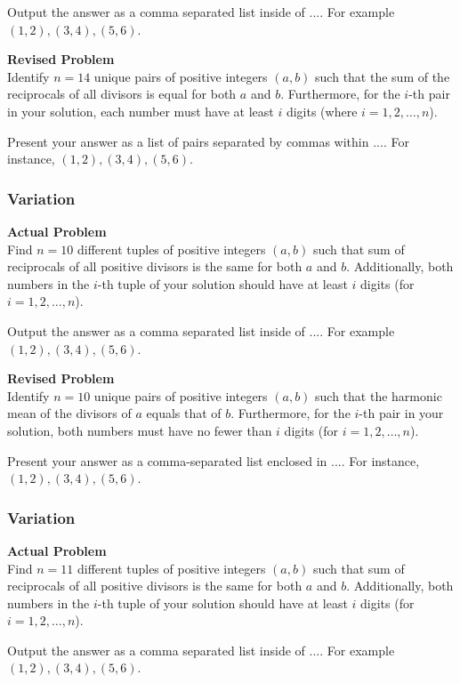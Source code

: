 Output the answer as a comma separated list inside of $\boxed{...}$. For example $\boxed{(1, 2), (3, 4), (5, 6)}$.

\textbf{Revised Problem}\\
Identify $n = 14$ unique pairs of positive integers $(a, b)$ such that the sum of the reciprocals of all divisors is equal for both $a$ and $b$. Furthermore, for the $i$-th pair in your solution, each number must have at least $i$ digits (where $i = 1, 2, \ldots, n$).

Present your answer as a list of pairs separated by commas within $\boxed{...}$. For instance, $\boxed{(1, 2), (3, 4), (5, 6)}$.

\subsubsection{Variation}
\textbf{Actual Problem}\\
Find $n = 10$ different tuples of positive integers $(a, b)$ such that sum of reciprocals of all positive divisors is the same for both $a$ and $b$.
Additionally, both numbers in the $i$-th tuple of your solution should have at least $i$ digits (for $i = 1, 2, \ldots, n$).


Output the answer as a comma separated list inside of $\boxed{...}$. For example $\boxed{(1, 2), (3, 4), (5, 6)}$.

\textbf{Revised Problem}\\
Identify $n = 10$ unique pairs of positive integers $(a, b)$ such that the harmonic mean of the divisors of $a$ equals that of $b$. Furthermore, for the $i$-th pair in your solution, both numbers must have no fewer than $i$ digits (for $i = 1, 2, \ldots, n$).

Present your answer as a comma-separated list enclosed in $\boxed{...}$. For instance, $\boxed{(1, 2), (3, 4), (5, 6)}$.

\subsubsection{Variation}
\textbf{Actual Problem}\\
Find $n = 11$ different tuples of positive integers $(a, b)$ such that sum of reciprocals of all positive divisors is the same for both $a$ and $b$.
Additionally, both numbers in the $i$-th tuple of your solution should have at least $i$ digits (for $i = 1, 2, \ldots, n$).


Output the answer as a comma separated list inside of $\boxed{...}$. For example $\boxed{(1, 2), (3, 4), (5, 6)}$.

